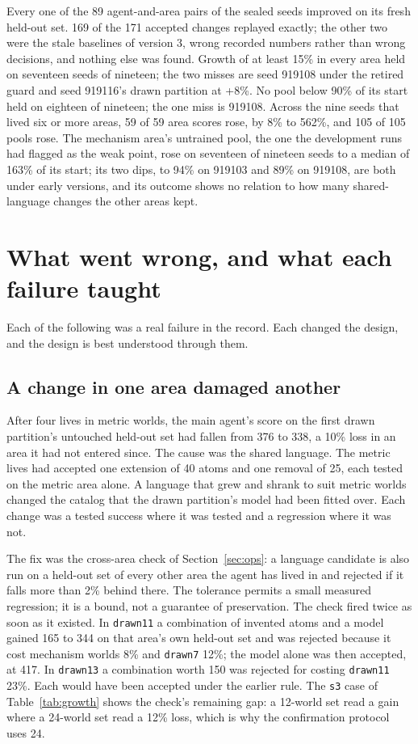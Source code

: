\documentclass[11pt]{article}
\begin{document}
Every one of the 89 agent-and-area pairs of the sealed seeds improved on its fresh held-out set. 169 of the 171 accepted changes replayed exactly; the other two were the stale baselines of version 3, wrong recorded numbers rather than wrong decisions, and nothing else was found. Growth of at least 15\% in every area held on seventeen seeds of nineteen; the two misses are seed 919108 under the retired guard and seed 919116's drawn partition at +8\%. No pool below 90\% of its start held on eighteen of nineteen; the one miss is 919108. Across the nine seeds that lived six or more areas, 59 of 59 area scores rose, by 8\% to 562\%, and 105 of 105 pools rose. The mechanism area's untrained pool, the one the development runs had flagged as the weak point, rose on seventeen of nineteen seeds to a median of 163\% of its start; its two dips, to 94\% on 919103 and 89\% on 919108, are both under early versions, and its outcome shows no relation to how many shared-language changes the other areas kept.

\section{What went wrong, and what each failure taught}

Each of the following was a real failure in the record. Each changed the design, and the design is best understood through them.

\subsection{A change in one area damaged another}
\label{sec:interference}

After four lives in metric worlds, the main agent's score on the first drawn partition's untouched held-out set had fallen from 376 to 338, a 10\% loss in an area it had not entered since. The cause was the shared language. The metric lives had accepted one extension of 40 atoms and one removal of 25, each tested on the metric area alone. A language that grew and shrank to suit metric worlds changed the catalog that the drawn partition's model had been fitted over. Each change was a tested success where it was tested and a regression where it was not.

The fix was the cross-area check of Section~\ref{sec:ops}: a language candidate is also run on a held-out set of every other area the agent has lived in and rejected if it falls more than 2\% behind there. The tolerance permits a small measured regression; it is a bound, not a guarantee of preservation. The check fired twice as soon as it existed. In \texttt{drawn11} a combination of invented atoms and a model gained 165 to 344 on that area's own held-out set and was rejected because it cost mechanism worlds 8\% and \texttt{drawn7} 12\%; the model alone was then accepted, at 417. In \texttt{drawn13} a combination worth 150 was rejected for costing \texttt{drawn11} 23\%. Each would have been accepted under the earlier rule. The \texttt{s3} case of Table~\ref{tab:growth} shows the check's remaining gap: a 12-world set read a gain where a 24-world set read a 12\% loss, which is why the confirmation protocol uses 24.
\end{document}
